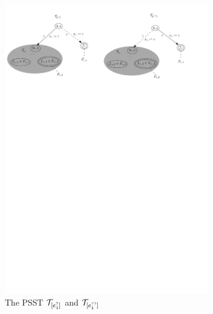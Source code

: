 %
		\begin{figure}[tb]
		\vspace{-2mm}
			\centering
			\includegraphics[width = 0.8\textwidth]{reg2pfa-6.pdf}
			\caption{The PSST $\mathcal{T}_{[e_1^?]}$ and $\mathcal{T}_{[e_1^{??}]}$}
			\label{fig-reg2pfa-6}
			\vspace{-4mm}
		\end{figure}

